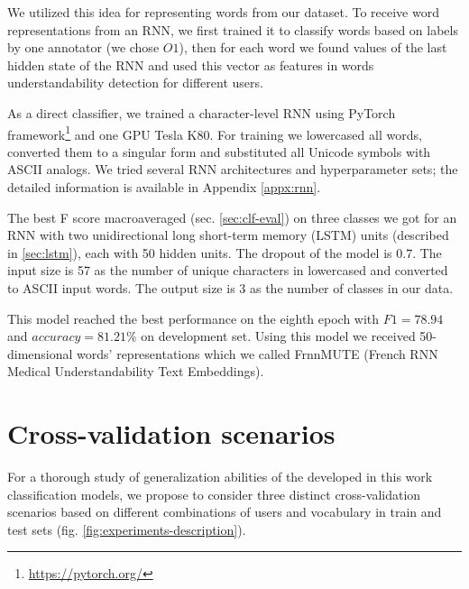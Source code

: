We utilized this idea for representing words from our dataset. To receive word representations from an RNN, we first trained it to classify words based on labels by one annotator (we chose $O1$), then for each word we found values of the last hidden state of the RNN and used this vector as features in words understandability detection for different users.

As a direct classifier, we trained a character-level RNN using PyTorch framework\footnote{\url{https://pytorch.org/}} and one GPU Tesla K80. For training we lowercased all words, converted them to a singular form and substituted all Unicode symbols with ASCII analogs.  We tried several RNN architectures and hyperparameter sets; the detailed information is available in Appendix \ref{appx:rnn}. 

The best F score macroaveraged (sec. \ref{sec:clf-eval}) on three classes we got for an RNN with two unidirectional long short-term memory (LSTM) units (described in \ref{sec:lstm}), each with 50 hidden units. The dropout of the model is 0.7. The input size is 57 as the number of unique characters in lowercased and converted to ASCII input words. The output size is 3 as the number of classes in our data.

This model reached the best performance on the eighth epoch with $F1= 78.94$ and $accuracy = 81.21\%$ on development set. Using this model we received 50-dimensional words' representations which we called FrnnMUTE (French RNN Medical Understandability Text Embeddings). 


\section{Cross-validation scenarios}
For a thorough study of generalization abilities of the developed in this work classification models, we propose to consider three distinct cross-validation scenarios based on different combinations of users and vocabulary in train and test sets (fig. \ref{fig:experiments-description}).

